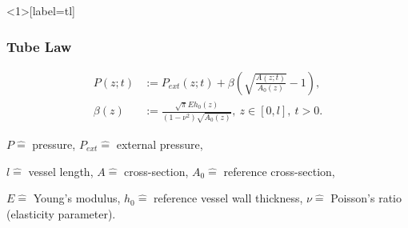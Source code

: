 \documentclass[compress]{beamer}
\begin{document}

\begin{frame}<1>[label=tl]
	\frametitle{Tube Law}
	\begin{align}
		P(z;t) &:= P_{ext}(z;t) + \beta \left( \sqrt{\frac{A(z;t)}{A_0(z)}}-1 \right),      \label{eq:p_tot}\\
		\beta(z) &:=  \frac{\sqrt{\pi} E h_0(z)}{(1-\nu^2) \sqrt{A_0(z)}},\  z \in \left[ 0,l \right], \ t > 0. 
	\end{align}

	\vfill

	{\tiny \centering 
		$P \hat{=}$ pressure,
		$P_{ext} \hat{=}$ external pressure,

		$l \hat{=}$ vessel length,
		$A \hat{=}$ cross-section,
		$A_0 \hat{=}$ reference cross-section,

		$E \hat{=}$ Young's modulus,
		$h_0 \hat{=}$ reference vessel wall thickness,
		$\nu \hat{=}$ Poisson's ratio (elasticity parameter). 
	\par}
\end{frame}

\end{document}
